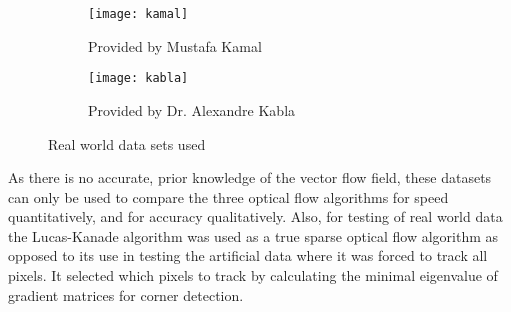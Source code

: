 \begin{figure}[htbp!]
  \centering
  \begin{subfigure}[b]{0.49\textwidth}
    \texttt{[image: kamal]}
    \caption{Provided by Mustafa Kamal}
    \label{fig:kamal}
  \end{subfigure}
  \begin{subfigure}[b]{0.49\textwidth}
    \texttt{[image: kabla]}
    \caption{Provided by Dr. Alexandre Kabla}
    \label{fig:kabla}
  \end{subfigure}
  \caption{Real world data sets used}
  \label{fig:realworld}
\end{figure}

As there is no accurate, prior knowledge of the vector flow field, these datasets can only be used to compare the three optical flow algorithms for speed quantitatively, and for accuracy qualitatively. Also, for testing of real world data the Lucas-Kanade algorithm was used as a true sparse optical flow algorithm as opposed to its use in testing the artificial data where it was forced to track all pixels. It selected which pixels to track by calculating the minimal eigenvalue of gradient matrices for corner detection.